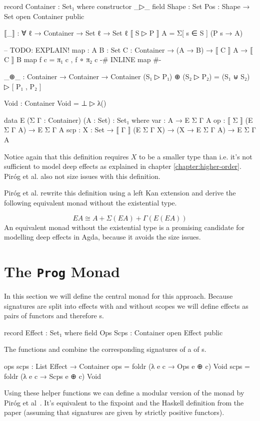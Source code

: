 \begin{code}[hide]
record Container : Set₁ where
  constructor _▷_
  field
    Shape : Set
    Pos : Shape → Set
open Container public

⟦_⟧ : ∀ {ℓ} → Container → Set ℓ → Set ℓ
⟦ S ▷ P ⟧ A = Σ[ s ∈ S ] (P s → A)

-- TODO: EXPLAIN!
map : {A B : Set} {C : Container} → (A → B) → ⟦ C ⟧ A → ⟦ C ⟧ B
map f c = π₁ c , f ∘ π₂ c
{-# INLINE map #-}

_⊕_ : Container → Container → Container
(S₁ ▷ P₁) ⊕ (S₂ ▷ P₂) = (S₁ ⊎ S₂) ▷ [ P₁ , P₂ ]

Void : Container
Void = ⊥ ▷ λ()
\end{code}
\begin{code}
data E (Σ Γ : Container) (A : Set) : Set₁ where
  var  : A → E Σ Γ A
  op   : ⟦ Σ ⟧ (E Σ Γ A) → E Σ Γ A
  scp  : {X : Set} → ⟦ Γ ⟧ (E Σ Γ X) → (X → E Σ Γ A) → E Σ Γ A
\end{code}
Notice again that this definition requires $X$ to be a smaller type than
 i.e. it's not sufficient to model deep effects as explained in
chapter \ref{chapter:higher-order}.
Piróg et al. also not size issues with this definition.

Piróg et al. rewrite this definition using a left Kan extension and derive the
following equivalent monad without the existential type.

\[
  EA \cong A + \Sigma{}(EA) + \Gamma{}(E(EA))
\]
An equivalent monad without the existential type is a promising candidate for
modelling deep effects in Agda, because it avoids the size issues.

\section{The \texttt{Prog} Monad}

In this section we will define the central monad for this approach.
Because signatures are split into effects with and without scopes we will define
effects as pairs of functors and therefore s.

\begin{code}
record Effect : Set₁ where
  field
    Ops Scps : Container
open Effect public
\end{code}
The functions  and  combine the
corresponding signatures of a  of s.

\begin{code}
ops scps : List Effect → Container
ops   = foldr  (λ e c → Ops   e ⊕ c)  Void
scps  = foldr  (λ e c → Scps  e ⊕ c)  Void
\end{code}
Using these helper functions we can define a modular version of the monad by
Piróg et al~\cite{DBLP:conf/lics/PirogSWJ18}.
It's equivalent to the fixpoint and the Haskell definition from the paper
(assuming that signatures are given by strictly positive functors).


